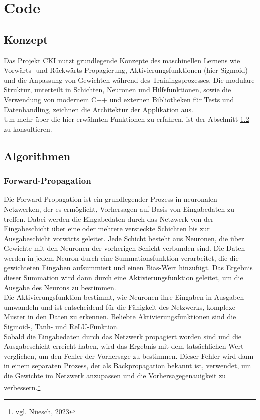 \section{Code}
\label{sec:RealCode}
\subsection{Konzept}
 Das Projekt CKI nutzt grundlegende Konzepte des maschinellen Lernens wie Vorwärts- und Rückwärts-Propagierung, Aktivierungsfunktionen (hier Sigmoid) und die Anpassung von Gewichten während des Trainingsprozesses. Die modulare Struktur, unterteilt in Schichten, Neuronen und Hilfsfunktionen, sowie die Verwendung von modernem C++ und externen Bibliotheken für Tests und Datenhandling, zeichnen die Architektur der Applikation aus.
\\
Um mehr über die hier erwähnten Funktionen zu erfahren, ist der Abschnitt \ref{sec:RealAlgorithmen} zu konsultieren.

\subsection{Algorithmen}
\label{sec:RealAlgorithmen}
\subsubsection{ Forward-Propagation}
\label{sec:RealForwardPropagation}
Die Forward-Propagation ist ein grundlegender Prozess in neuronalen Netzwerken, der es ermöglicht, Vorhersagen auf Basis von Eingabedaten zu treffen. Dabei werden die Eingabedaten durch das Netzwerk von der Eingabeschicht über eine oder mehrere versteckte Schichten bis zur Ausgabeschicht vorwärts geleitet. Jede Schicht besteht aus Neuronen, die über Gewichte mit den Neuronen der vorherigen Schicht verbunden sind. Die Daten werden in jedem Neuron durch eine Summationsfunktion verarbeitet, die die gewichteten Eingaben aufsummiert und einen Bias-Wert hinzufügt. Das Ergebnis dieser Summation wird dann durch eine Aktivierungsfunktion geleitet, um die Ausgabe des Neurons zu bestimmen.
\\
Die Aktivierungsfunktion bestimmt, wie Neuronen ihre Eingaben in Ausgaben umwandeln und ist entscheidend für die Fähigkeit des Netzwerks, komplexe Muster in den Daten zu erkennen. Beliebte Aktivierungsfunktionen sind die Sigmoid-, Tanh- und ReLU-Funktion.
\\
Sobald die Eingabedaten durch das Netzwerk propagiert worden sind und die Ausgabeschicht erreicht haben, wird das Ergebnis mit dem tatsächlichen Wert verglichen, um den Fehler der Vorhersage zu bestimmen. Dieser Fehler wird dann in einem separaten Prozess, der als Backpropagation bekannt ist, verwendet, um die Gewichte im Netzwerk anzupassen und die Vorhersagegenauigkeit zu verbessern.\footnote{vgl. Nüesch, 2023}
